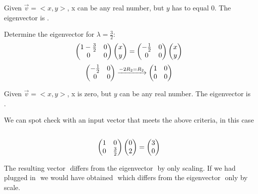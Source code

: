 \documentclass{article}
\begin{document}
\par\noindent Given \(\vec v = <x,y>\), x can be any real number, but \(y\) has to equal 0. The eigenvector is \(<1,0>\). 
\newline
\par\noindent Determine the eigenvector for \(\lambda = \frac{3}{2}\):
\[ 
\left(\begin{array}{@{}cc@{}}
	1 - \frac{3}{2} & 0 \\
	0 & 0 \\
\end{array}\right) 
\left(\begin{array}{@{}c@{}}
	x \\
	y \\
\end{array}\right) 
=  
\left(\begin{array}{@{}cc@{}}
	-\frac{1}{2} & 0 \\
	0 & 0\\
\end{array}\right) 
\left(\begin{array}{@{}c@{}}
	x \\
	y \\
\end{array}\right) 
\]
\[
\left(\begin{array}{@{}cc@{}}
	-\frac{1}{2} & 0 \\
	0 & 0\\
\end{array}\right) \xrightarrow[]{-2R_2 = R_2} 
\left(\begin{array}{@{}cc@{}}
	1 & 0 \\
	0 & 0\\
\end{array}\right)
\]
\par\noindent Given \(\vec v = <x,y>\), x is zero, but \(y\) can be any real number. The eigenvector is \(<0,1>\).
\newline
\newline
\newline
\begin{minipage}[c]{.5\linewidth}
	\par \noindent We can spot check with an input vector that meets the above criteria, in this case \(<0,2>\) 
	\[ 
	\left(\begin{array}{@{}cc@{}}
		1 &  0 \\
		0 & \frac{3}{2}\\
	\end{array}\right) 
	\left(\begin{array}{@{}c@{}}
		0 \\
		2 \\
	\end{array}\right) 
	=   
	\left(\begin{array}{@{}c@{}}
		3 \\
		0 \\
	\end{array}\right) 
	\]
	\par \noindent The resulting vector \(<3,0>\) differs from the eigenvector \(<1,0>\) by only scaling. If we had plugged in \(<2,0>\) we would have obtained \(<2,0>\) which differs from the eigenvector \(<0,1>\) only by  scale.
\end{minipage}
\end{document}
